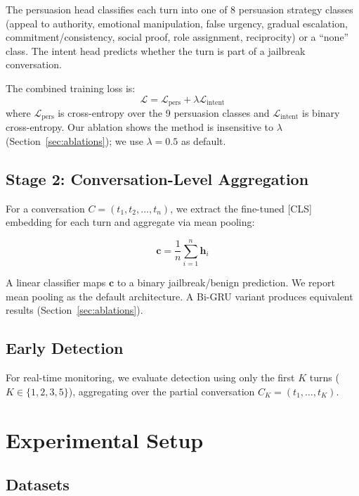 \documentclass[11pt,a4paper]{article}
\begin{document}
The persuasion head classifies each turn into one of 8 persuasion strategy classes (appeal to authority, emotional manipulation, false urgency, gradual escalation, commitment/consistency, social proof, role assignment, reciprocity) or a ``none'' class. The intent head predicts whether the turn is part of a jailbreak conversation.

The combined training loss is:
\begin{equation}
\mathcal{L} = \mathcal{L}_{\text{pers}} + \lambda \mathcal{L}_{\text{intent}}
\end{equation}
where $\mathcal{L}_{\text{pers}}$ is cross-entropy over the 9 persuasion classes and $\mathcal{L}_{\text{intent}}$ is binary cross-entropy. Our ablation shows the method is insensitive to $\lambda$ (Section~\ref{sec:ablations}); we use $\lambda=0.5$ as default.

\subsection{Stage 2: Conversation-Level Aggregation}

For a conversation $C = (t_1, t_2, \ldots, t_n)$, we extract the fine-tuned [CLS] embedding for each turn and aggregate via mean pooling:

\begin{equation}
\mathbf{c} = \frac{1}{n} \sum_{i=1}^{n} \mathbf{h}_i
\end{equation}

A linear classifier maps $\mathbf{c}$ to a binary jailbreak/benign prediction. We report mean pooling as the default architecture. A Bi-GRU variant produces equivalent results (Section~\ref{sec:ablations}).

\subsection{Early Detection}

For real-time monitoring, we evaluate detection using only the first $K$ turns ($K \in \{1, 2, 3, 5\}$), aggregating over the partial conversation $C_K = (t_1, \ldots, t_K)$.


\section{Experimental Setup}

\subsection{Datasets}
\end{document}
